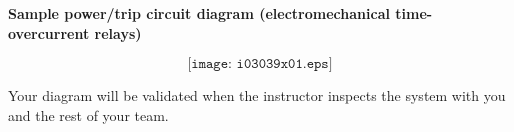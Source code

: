 \vfil \eject

\noindent
{\bf Sample power/trip circuit diagram (electromechanical time-overcurrent relays)}

$$\texttt{[image: i03039x01.eps]}$$













Your diagram will be validated when the instructor inspects the system with you and the rest of your team.











